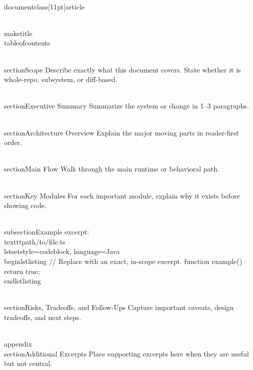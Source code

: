 \\documentclass[11pt]{article}
\begin{document}
\\maketitle
\\tableofcontents

\\section{Scope}
Describe exactly what this document covers.
State whether it is whole-repo, subsystem, or diff-based.

\\section{Executive Summary}
Summarize the system or change in 1--3 paragraphs.

\\section{Architecture Overview}
Explain the major moving parts in reader-first order.

\\section{Main Flow}
Walk through the main runtime or behavioral path.

\\section{Key Modules}
For each important module, explain why it exists before showing code.

\\subsection{Example excerpt: \\texttt{path/to/file.ts}}
\\lstset{style=codeblock, language=Java}
\\begin{lstlisting}
// Replace with an exact, in-scope excerpt.
function example() {
  return true;
}
\\end{lstlisting}

\\section{Risks, Tradeoffs, and Follow-Ups}
Capture important caveats, design tradeoffs, and next steps.

\\appendix
\\section{Additional Excerpts}
Place supporting excerpts here when they are useful but not central.

\
\end{document}
